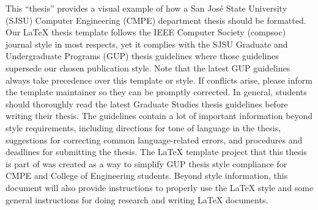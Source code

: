 This ``thesis'' provides a visual example of how a San Jos\'{e} State University (SJSU) Computer Engineering (CMPE) department thesis should be formatted. Our LaTeX thesis template follows the IEEE Computer Society (compsoc) journal style in most respects, yet it complies with the SJSU Graduate and Undergraduate Programs (GUP) thesis guidelines where those guidelines supersede our chosen publication style. Note that the latest GUP guidelines always take precedence over this template or style. If conflicts arise, please inform the template maintainer so they can be promptly corrected. In general, students should thoroughly read the latest Graduate Studies thesis guidelines before writing their thesis. The guidelines contain a lot of important information beyond style requirements, including directions for tone of language in the thesis, suggestions for correcting common language-related errors, and procedures and deadlines for submitting the thesis. The LaTeX template project that this thesis is part of was created as a way to simplify GUP thesis style compliance for CMPE and College of Engineering students. Beyond style information, this document will also provide instructions to properly use the LaTeX style and some general instructions for doing research and writing LaTeX documents.